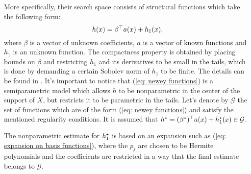 More specifically, their search space consists of structural functions which take the following form:
\begin{equation}
    \label{eq: newey functions}
    h ( x ) = \beta^{ \top } a ( x ) + h_{ 1 } ( x )
,\end{equation}
where $ \beta $ is a vector of unknown coefficients, $ a $ is a vector of known functions and $ h_{ 1 } $ is an unknown function.
The compactness property is obtained by placing bounds on $ \beta $ and restricting $ h_{ 1 } $ and its derivatives to be small in the tails, which is done by demanding a certain Sobolev norm of $ h_{ 1 } $ to be finite.
The details can be found in \cite{newey2003}.
It's important to notice that (\ref{eq: newey functions}) is a semiparametric model which allows $ h $ to be nonparametric in the center of the support of $ X $, but restricts it to be parametric in the tails.
Let's denote by $ \mathcal{G} $ the set of functions which are of the form (\ref{eq: newey functions}) and satisfy the mentioned regularity conditions.
It is assumed that $ h^{ \star } = ( \beta^{ \star } ) ^{ \top } a ( x ) + h^{ \star }_{ 1 } ( x ) \in \mathcal{G} $.

The nonparametric estimate for $ h^{ \star }_{ 1 } $ is based on an expansion such as (\ref{eq: expansion on basis functions}), where the $ p_{ j } $ are chosen to be Hermite polynomials and the coefficients are restricted in a way that the final estimate belongs to $ \mathcal{G} $.

